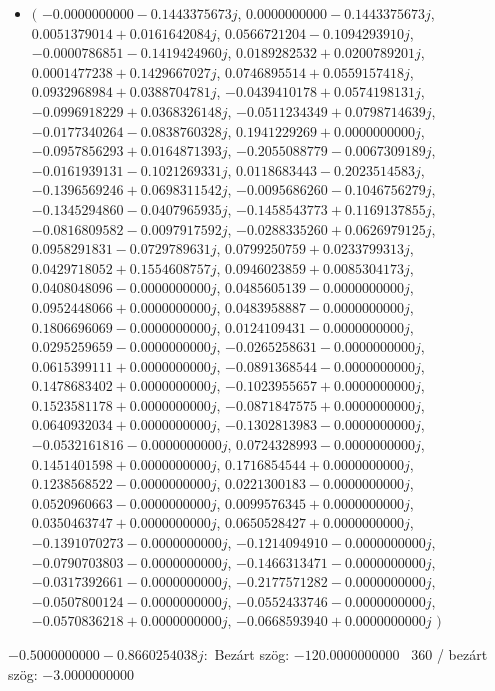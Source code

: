 \documentclass[14pt,a4paper]{article}
\begin{document}
\begin{itemize}
\item
$\big($
$-0.0000000000-0.1443375673j$, $0.0000000000-0.1443375673j$, $0.0051379014+0.0161642084j$, $0.0566721204-0.1094293910j$, $-0.0000786851-0.1419424960j$, $0.0189282532+0.0200789201j$, $0.0001477238+0.1429667027j$, $0.0746895514+0.0559157418j$, $0.0932968984+0.0388704781j$, $-0.0439410178+0.0574198131j$, $-0.0996918229+0.0368326148j$, $-0.0511234349+0.0798714639j$, $-0.0177340264-0.0838760328j$, $0.1941229269+0.0000000000j$, $-0.0957856293+0.0164871393j$, $-0.2055088779-0.0067309189j$, $-0.0161939131-0.1021269331j$, $0.0118683443-0.2023514583j$, $-0.1396569246+0.0698311542j$, $-0.0095686260-0.1046756279j$, $-0.1345294860-0.0407965935j$, $-0.1458543773+0.1169137855j$, $-0.0816809582-0.0097917592j$, $-0.0288335260+0.0626979125j$, $0.0958291831-0.0729789631j$, $0.0799250759+0.0233799313j$, $0.0429718052+0.1554608757j$, $0.0946023859+0.0085304173j$, $0.0408048096-0.0000000000j$, $0.0485605139-0.0000000000j$, $0.0952448066+0.0000000000j$, $0.0483958887-0.0000000000j$, $0.1806696069-0.0000000000j$, $0.0124109431-0.0000000000j$, $0.0295259659-0.0000000000j$, $-0.0265258631-0.0000000000j$, $0.0615399111+0.0000000000j$, $-0.0891368544-0.0000000000j$, $0.1478683402+0.0000000000j$, $-0.1023955657+0.0000000000j$, $0.1523581178+0.0000000000j$, $-0.0871847575+0.0000000000j$, $0.0640932034+0.0000000000j$, $-0.1302813983-0.0000000000j$, $-0.0532161816-0.0000000000j$, $0.0724328993-0.0000000000j$, $0.1451401598+0.0000000000j$, $0.1716854544+0.0000000000j$, $0.1238568522-0.0000000000j$, $0.0221300183-0.0000000000j$, $0.0520960663-0.0000000000j$, $0.0099576345+0.0000000000j$, $0.0350463747+0.0000000000j$, $0.0650528427+0.0000000000j$, $-0.1391070273-0.0000000000j$, $-0.1214094910-0.0000000000j$, $-0.0790703803-0.0000000000j$, $-0.1466313471-0.0000000000j$, $-0.0317392661-0.0000000000j$, $-0.2177571282-0.0000000000j$, $-0.0507800124-0.0000000000j$, $-0.0552433746-0.0000000000j$, $-0.0570836218+0.0000000000j$, $-0.0668593940+0.0000000000j$
$\big)$
\end{itemize}
$-0.5000000000-0.8660254038j$:\
Bezárt szög: $-120.0000000000$ \
360 / bezárt szög: $-3.0000000000$\
\end{document}
